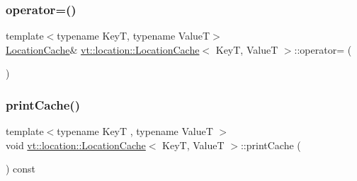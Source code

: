 \mbox{\label{structvt_1_1location_1_1_location_cache_a31d50fe03fe4686019333d1166d52769}} 
\subsubsection{\texorpdfstring{operator=()}{operator=()}}
{\footnotesize\ttfamily template$<$typename KeyT, typename ValueT$>$ \\
\hyperlink{structvt_1_1location_1_1_location_cache}{Location\+Cache}\& \hyperlink{structvt_1_1location_1_1_location_cache}{vt\+::location\+::\+Location\+Cache}$<$ KeyT, ValueT $>$\+::operator= (\begin{DoxyParamCaption}\item[{\hyperlink{structvt_1_1location_1_1_location_cache}{Location\+Cache}$<$ KeyT, ValueT $>$ const \&}]{ }\end{DoxyParamCaption})\hspace{0.3cm}{\ttfamily [default]}}

\mbox{\label{structvt_1_1location_1_1_location_cache_a0c8f06fd5c1ff26c30c0c25b5800ba30}} 
\subsubsection{\texorpdfstring{print\+Cache()}{printCache()}}
{\footnotesize\ttfamily template$<$typename KeyT , typename ValueT $>$ \\
void \hyperlink{structvt_1_1location_1_1_location_cache}{vt\+::location\+::\+Location\+Cache}$<$ KeyT, ValueT $>$\+::print\+Cache (\begin{DoxyParamCaption}{ }\end{DoxyParamCaption}) const}

\mbox{\label{structvt_1_1location_1_1_location_cache_ac39441e200c3c3023bda193f7075f372}} 
